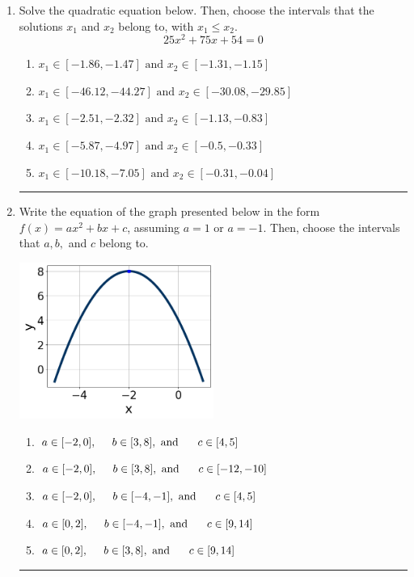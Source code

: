 \documentclass[14pt]{extbook}
\newcommand{\litem}[1]{\item#1\hspace*{-1cm}\rule{\textwidth}{0.4pt}}
\begin{document}
\begin{enumerate}
\litem{
Solve the quadratic equation below. Then, choose the intervals that the solutions $x_1$ and $x_2$ belong to, with $x_1 \leq x_2$.\[ 25x^{2} +75 x + 54 = 0 \]\begin{enumerate}[label=\Alph*.]
\item \( x_1 \in [-1.86, -1.47] \text{ and } x_2 \in [-1.31, -1.15] \)
\item \( x_1 \in [-46.12, -44.27] \text{ and } x_2 \in [-30.08, -29.85] \)
\item \( x_1 \in [-2.51, -2.32] \text{ and } x_2 \in [-1.13, -0.83] \)
\item \( x_1 \in [-5.87, -4.97] \text{ and } x_2 \in [-0.5, -0.33] \)
\item \( x_1 \in [-10.18, -7.05] \text{ and } x_2 \in [-0.31, -0.04] \)

\end{enumerate} }
\litem{
Write the equation of the graph presented below in the form $f(x)=ax^2+bx+c$, assuming  $a=1$ or $a=-1$. Then, choose the intervals that $a, b,$ and $c$ belong to.
\begin{center}
    \includegraphics[width=0.5\textwidth]{../Figures/quadraticGraphToEquationB.png}
\end{center}
\begin{enumerate}[label=\Alph*.]
\item \( a \in [-2, 0], \hspace*{5mm} b \in [3, 8], \text{ and } \hspace*{5mm} c \in [4, 5] \)
\item \( a \in [-2, 0], \hspace*{5mm} b \in [3, 8], \text{ and } \hspace*{5mm} c \in [-12, -10] \)
\item \( a \in [-2, 0], \hspace*{5mm} b \in [-4, -1], \text{ and } \hspace*{5mm} c \in [4, 5] \)
\item \( a \in [0, 2], \hspace*{5mm} b \in [-4, -1], \text{ and } \hspace*{5mm} c \in [9, 14] \)
\item \( a \in [0, 2], \hspace*{5mm} b \in [3, 8], \text{ and } \hspace*{5mm} c \in [9, 14] \)


\end{enumerate}}
\end{enumerate}
\end{document}
